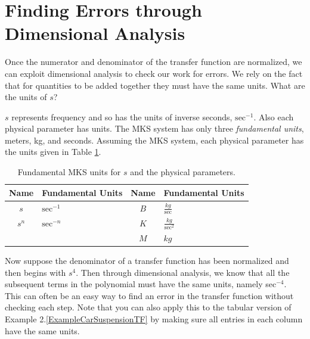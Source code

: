 \begin{ExampleCont}
\end{ExampleCont}



\section{Finding Errors through Dimensional Analysis}

Once the numerator and denominator of the transfer function are normalized, we can exploit dimensional analysis to check our work for errors.   We rely on the fact that for quantities to be added together they must have the same units.  What are the units of $s$?

$s$ represents frequency and so has the units of inverse seconds, $\mathrm{sec}^{-1}$.  Also each physical parameter has units.  The MKS system has only three {\it fundamental units}, meters, kg, and seconds. Assuming the MKS system, each physical parameter has the units given in Table \ref{unitstable}.

\begin{table}[h]\centering
\renewcommand{\arraystretch}{1.5} %
\begin{tabular}{c|l||c|l}
Name	& Fundamental Units & Name	& Fundamental Units \\ \hline
$s$	& $\mathrm{sec}^{-1}$      & $B$	& $\frac{kg}{\mathrm{sec}}$  \\
$s^n$   & $\mathrm{sec}^{-n}$  & $K$	& $\frac{kg}{\mathrm{sec}^2}$  \\
& & $M$	& $kg$ \\
\end{tabular}
\caption{Fundamental MKS units for $s$ and the physical parameters.}\label{unitstable}
\end{table}

Now suppose the denominator of a transfer function has been normalized and then begins with $s^4$.   Then through dimensional analysis, we know that all the subsequent terms in the polynomial must have the same units, namely sec$^{-4}$.  This can often be an easy way to find an error in the transfer function without checking each step. Note that you can also apply this to the tabular version of
Example 2.\ref{ExampleCarSuspensionTF}
by making sure all entries in each column have the same units.




